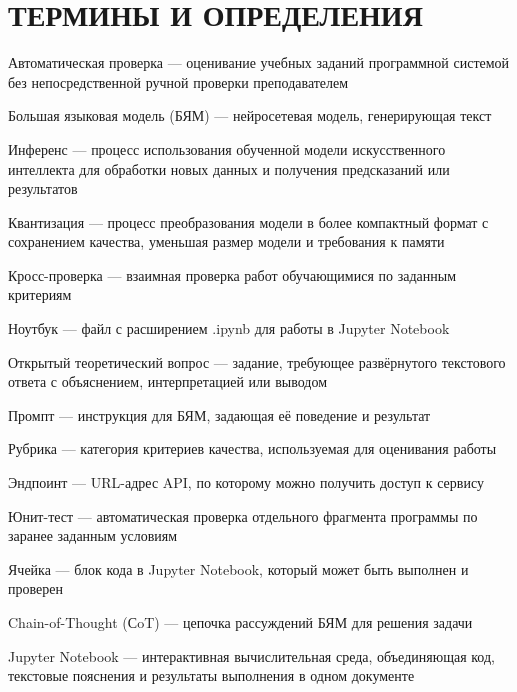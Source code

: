 \chapter*{ТЕРМИНЫ И ОПРЕДЕЛЕНИЯ}
\setlength{\parindent}{0pt}
\begin{list}{}{%
  \setlength{\leftmargin}{0pt}%
  \setlength{\rightmargin}{1.5cm}%
  \setlength{\labelwidth}{0pt}%
  \setlength{\labelsep}{0pt}%
  \setlength{\itemindent}{0pt}%
  \setlength{\itemsep}{0.5em}%
  \setlength{\parsep}{0pt}%
  \setlength{\topsep}{0pt}%
}
\item[] Автоматическая проверка --- оценивание учебных заданий программной системой без непосредственной ручной проверки преподавателем
\item[] Большая языковая модель (БЯМ) --- нейросетевая модель, генерирующая текст
\item[] Инференс --- процесс использования обученной модели искусственного интеллекта для обработки новых данных и получения предсказаний или результатов
\item[] Квантизация --- процесс преобразования модели в более компактный формат с сохранением качества, уменьшая размер модели и требования к памяти
\item[] Кросс-проверка --- взаимная проверка работ обучающимися по заданным критериям
\item[] Ноутбук --- файл с расширением .ipynb для работы в Jupyter Notebook
\item[] Открытый теоретический вопрос --- задание, требующее развёрнутого текстового ответа с объяснением, интерпретацией или выводом
\item[] Промпт --- инструкция для БЯМ, задающая её поведение и результат
\item[] Рубрика --- категория критериев качества, используемая для оценивания работы
\item[] Эндпоинт --- URL-адрес API, по которому можно получить доступ к сервису
\item[] Юнит-тест --- автоматическая проверка отдельного фрагмента программы по заранее заданным условиям
\item[] Ячейка --- блок кода в Jupyter Notebook, который может быть выполнен и проверен
\item[] Chain-of-Thought (СoT) --- цепочка рассуждений БЯМ для решения задачи
\item[] Jupyter Notebook --- интерактивная вычислительная среда, объединяющая код, текстовые пояснения и результаты выполнения в одном документе
\end{list}
